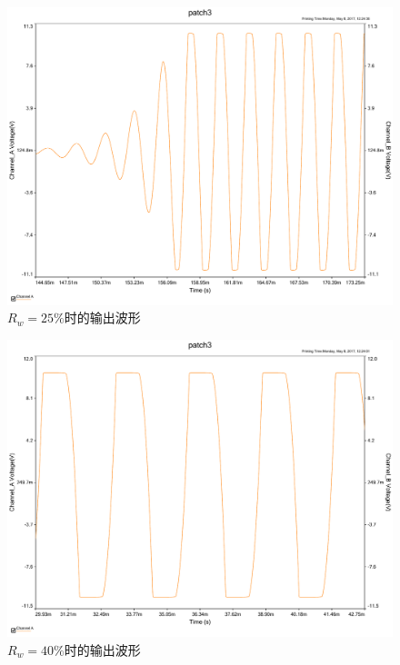 \documentclass[UTF8,a4paper]{paper}
\begin{document}
\begin{multicols}{2}
\begin{figure}[H]
\centering
\includegraphics[width=\columnwidth]{25ac.pdf}
\caption{$R_w=25\%$时的输出波形}
\label{25}
\end{figure}
\begin{figure}[H]
\centering
\includegraphics[width=\columnwidth]{40ac.pdf}
\caption{$R_w=40\%$时的输出波形}
\label{40}
\end{figure}
\begin{figure}[H]
\centering

\end{figure}
\end{multicols}
\end{document}
